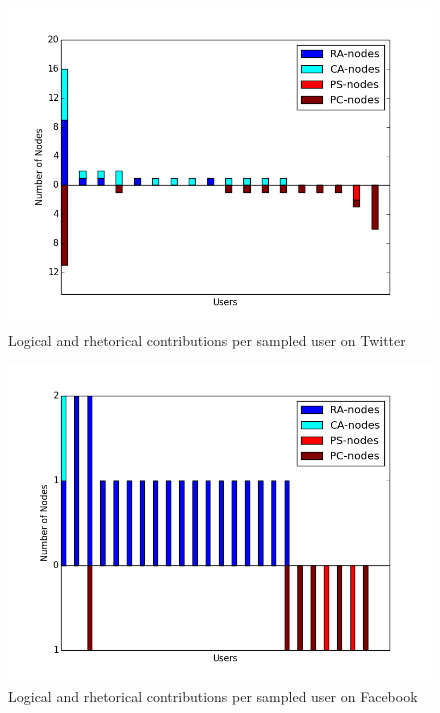 \begin{figure}
\centering
\includegraphics[scale=\scaleResults]{./figures/rhetoric_per_user/twitter.png}
\caption{Logical and rhetorical contributions per sampled user on Twitter}
\label{figure:rhetoricuser:Twitter}
\end{figure}

\begin{figure}
\centering
\includegraphics[scale=\scaleResults]{./figures/rhetoric_per_user/facebook.png}
\caption{Logical and rhetorical contributions per sampled user on Facebook}
\label{figure:rhetoricuser:Facebook}
\end{figure}

